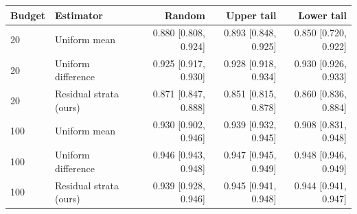 \begin{tabular}{llrrr}
\toprule
Budget & Estimator & Random & Upper tail & Lower tail \\
\midrule
20 & Uniform mean & 0.880 [0.808, 0.924] & 0.893 [0.848, 0.925] & 0.850 [0.720, 0.922] \\
20 & Uniform difference & 0.925 [0.917, 0.930] & 0.928 [0.918, 0.934] & 0.930 [0.926, 0.933] \\
20 & Residual strata (ours) & 0.871 [0.847, 0.888] & 0.851 [0.815, 0.878] & 0.860 [0.836, 0.884] \\
100 & Uniform mean & 0.930 [0.902, 0.946] & 0.939 [0.932, 0.945] & 0.908 [0.831, 0.948] \\
100 & Uniform difference & 0.946 [0.943, 0.948] & 0.947 [0.945, 0.949] & 0.948 [0.946, 0.949] \\
100 & Residual strata (ours) & 0.939 [0.928, 0.946] & 0.945 [0.941, 0.948] & 0.944 [0.941, 0.947] \\
\bottomrule
\end{tabular}